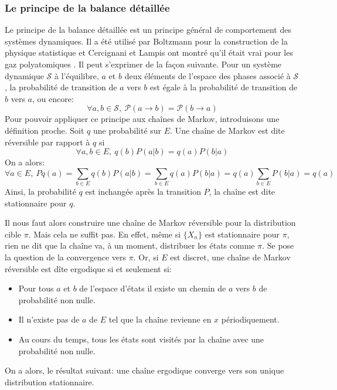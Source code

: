 \subsubsection{Le principe de la balance détaillée}

Le principe de la balance détaillée est un principe général de comportement des systèmes dynamiques. Il a été utilisé par Boltzmann pour la construction de la physique statistique et Cercignani et Lampis ont montré qu'il était vrai pour les gaz polyatomiques \cite{Cercignani81}. Il peut s'exprimer de la façon suivante. Pour un système dynamique $\mathcal{S}$ à l'équilibre, $a$ et $b$ deux éléments de l'espace des phases associé à $\mathcal{S}$, la probabilité de transition de $a$ vers $b$ est égale à la probabilité de transition de $b$ vers $a$, ou encore: 
\begin{equation}
\forall a,b \in \mathcal{S},\ \mathcal{P}(a \rightarrow b) = \mathcal{P}(b \rightarrow a) 
\end{equation}
Pour pouvoir appliquer ce principe aux chaînes de Markov, introduisons une définition proche. Soit $q$ une probabilité sur $E$. Une chaîne de Markov est dite réversible par rapport à $q$ si
\begin{equation}
\forall a,b \in E,\ q(b)P(a|b)=q(a)P(b|a)
\end{equation}
On a alors:
\begin{equation}
\forall a \in E,\ P q(a) = \sum_{b \in E} q(b)P(a|b) = \sum_{b \in E} q(a)P(b|a) = q(a) \sum_{b \in E}P(b|a) = q(a)
\end{equation}
Ainsi, la probabilité $q$ est inchangée après la transition $P$, la chaîne est dite stationnaire pour $q$.

Il nous faut alors construire une chaîne de Markov réversible pour la distribution cible $\pi$. Mais cela ne suffit pas. En effet, même si $\{X_n\}$ est stationnaire pour $\pi$, rien ne dit que la chaîne va, à un moment, distribuer les états comme $\pi$. Se pose la question de la convergence vers $\pi$. Or, si $E$ est discret, une chaîne de Markov réversible est dîte ergodique si et seulement si:
\begin{itemize}
\item Pour tous $a$ et $b$ de l'espace d'états il existe un chemin de $a$  vers $b$  de probabilité non nulle. 
\item Il n'existe pas de $a$ de $E$ tel que la chaîne revienne en $x$ périodiquement.
\item  Au cours du temps, tous les états sont visités par la chaîne avec une probabilité non nulle. 
\end{itemize}
On a alors, le résultat suivant: une chaîne ergodique converge vers son unique distribution stationnaire.

